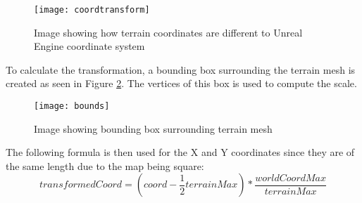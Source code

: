\begin{figure}[ht]
	\texttt{[image: coordtransform]}
	\centering
	\caption{Image showing how terrain coordinates are different to Unreal Engine coordinate system}
	\label{fig:coordinatesystem}
\end{figure}

To calculate the transformation, a bounding box surrounding the terrain mesh is created as seen in Figure \ref{fig:boundingbox}. The vertices of this box is used to compute the scale.
\newline
\par

\begin{figure}[h]
	\texttt{[image: bounds]}
	\centering
	\caption{Image showing bounding box surrounding terrain mesh}
	\label{fig:boundingbox}
\end{figure}

The following formula is then used for the X and Y coordinates since they are of the same length due to the map being square:
\[transformedCoord = (coord - \frac{1}{2}terrainMax) * \frac{worldCoordMax}{terrainMax}\]

